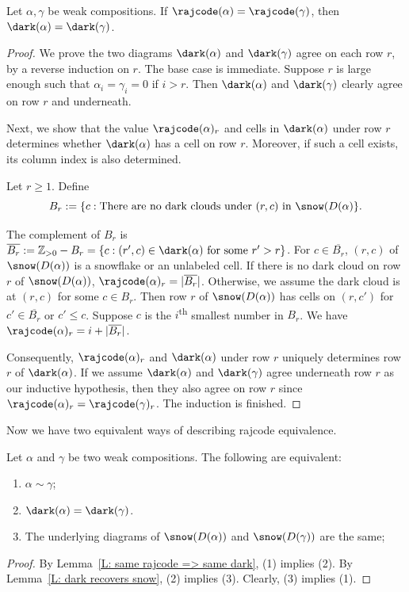 \begin{lemma}
\label{L: same rajcode => same dark}
Let $\alpha, \gamma$ be weak compositions.
If $\rajcode(\alpha) = \rajcode(\gamma)$,
then $\dark(\alpha) = \dark(\gamma)$.
\end{lemma}
\begin{proof}
We prove the two diagrams $\dark(\alpha)$ 
and $\dark(\gamma)$ agree on each row $r$,
by a reverse induction on $r$.
The base case is immediate.
Suppose $r$ is large enough
such that $\alpha_i = \gamma_i = 0$
if $i > r$.
Then $\dark(\alpha)$ and $\dark(\gamma)$
clearly agree on row $r$ and underneath.

Next, we show that the value $\rajcode(\alpha)_r$ and cells in $\dark(\alpha)$ under row $r$ 
determines whether $\dark(\alpha)$ has a cell on row $r$.
Moreover, if such a cell exists, its column index is also determined. 

Let $r\geqslant 1$.
Define
$$B_r :=\{c: \textrm{There are no dark clouds under } (r,c) \textrm{ in } \snow(D(\alpha) \}.$$

The complement of $B_r$ is $\overline{B_r} := \mathbb{Z}_{>0} - B_r = \{c: (r',c) \in \dark(\alpha) \textrm{ for some } r' > r \}$.
For $c \in \overline{B_r}$,
$(r,c)$ of $\snow(D(\alpha))$ is a snowflake or an unlabeled cell.
If there is no dark cloud on row $r$ of $\snow(D(\alpha))$,
$\rajcode(\alpha)_r = |\overline{B_r}|$.
Otherwise, we assume the dark cloud is at $(r,c)$ for some $c \in B_r$.
Then row $r$ of $\snow(D(\alpha))$ has cells on 
$(r,c')$ for $c' \in \overline{B_r}$ or $c' \leq c$.
Suppose $c$ is the $i$\textsuperscript{th} smallest number in $B_r$.
We have $\rajcode(\alpha)_r = i + |\overline{B_r}|$.

Consequently, $\rajcode(\alpha)_r$ and $\dark(\alpha)$ under row $r$
uniquely determines row $r$ of $\dark(\alpha)$.
If we assume $\dark(\alpha)$ and $\dark(\gamma)$
agree underneath row $r$ as our inductive hypothesis,
then they also agree on row $r$ since $\rajcode(\alpha)_r = \rajcode(\gamma)_r$.
The induction is finished. 
\end{proof}

Now we have two equivalent ways of describing rajcode equivalence.
\begin{prop}
\label{P: equivalence}
Let $\alpha$ and $\gamma$ be two weak compositions. 
The following are equivalent:
\begin{enumerate}
\item $\alpha \sim \gamma$;
\item $\dark(\alpha) = \dark(\gamma)$.
\item The underlying diagrams of $\snow(D(\alpha))$ and  $\snow(D(\gamma))$
are the same;
\end{enumerate}
\end{prop}
\begin{proof}
By Lemma~\ref{L: same rajcode => same dark}, (1) implies (2).
By Lemma~\ref{L: dark recovers snow}, (2) implies (3).
Clearly, (3) implies (1).
\end{proof}

